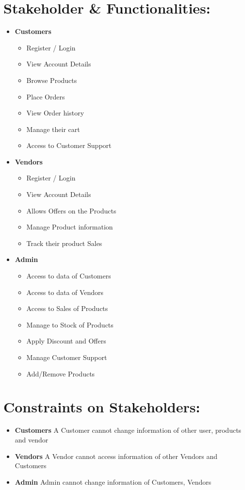 \documentclass{article}
\begin{document}
\section{Stakeholder \& Functionalities:}
\begin{itemize}
\item \textbf{Customers} 
\begin{itemize}
    \item Register / Login
    \item View Account Details
    \item Browse Products
    \item Place Orders
    \item View Order history
    \item Manage their cart
    \item Access to Customer Support
\end{itemize}
\item \textbf{Vendors}
\begin{itemize}
    \item Register / Login
    \item View Account Details
    \item Allows Offers on the Products
    \item Manage Product information
    \item Track their product Sales
\end{itemize}
\item \textbf{Admin}
\begin{itemize}
    \item Access to data of Customers
    \item Access to data of Vendors
    \item Access to Sales of Products
    \item Manage to Stock of Products
    \item Apply Discount and Offers
    \item Manage Customer Support
    \item Add/Remove Products
\end{itemize}
\end{itemize}
\section{Constraints on Stakeholders:}
\begin{itemize}
    \item \textbf{Customers} A Customer cannot change information of other user, products and vendor
    \item \textbf{Vendors} A Vendor cannot access information of other Vendors and Customers
    \item \textbf{Admin} Admin cannot change information of Customers, Vendors
    \end{itemize}
\end{document}
